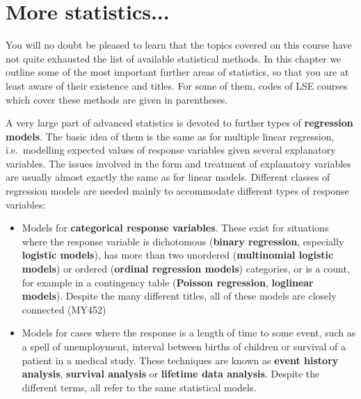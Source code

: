\chapter{More statistics...}
\label{c_more}

You will no doubt be pleased to learn that the topics covered on this
course have not quite exhausted the list of available statistical
methods. In this chapter we outline some of the most important
further areas of statistics, so that you are at least aware of their
existence and titles. For some of them, codes of LSE courses which cover
these methods are given in parentheses.

A very large part of advanced statistics is devoted to further types of
\textbf{regression models}. The basic idea of them is the same as for
multiple linear regression, i.e.\ modelling expected values of response
variables given several explanatory variables. The issues involved in
the form and treatment of explanatory variables are usually almost
exactly the same as for linear models. Different classes of regression
models are needed mainly to accommodate different types of response
variables:
\begin{itemize}
\item
Models for \textbf{categorical response variables}. These exist
for situations where the response
variable is dichotomous (\textbf{binary regression}, especially
\textbf{logistic models}), has more than two unordered
(\textbf{multinomial logistic models})
or ordered (\textbf{ordinal regression
models}) categories, or is a count, for example in a contingency table
(\textbf{Poisson regression}, \textbf{loglinear models}).
Despite the many different titles, all of
these models are closely connected
(MY452)
\item
Models for cases where the response is a length of time to some event,
such as a spell of unemployment, interval between births of children
or survival of
a patient in a medical study. These techniques are known as
\textbf{event history analysis}, \textbf{survival analysis} or
\textbf{lifetime data analysis}. Despite the different terms,
all refer to the same statistical models.
\end{itemize}


